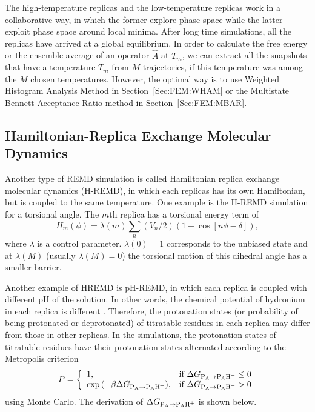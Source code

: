 The high-temperature replicas and the low-temperature replicas work in a collaborative way, in which the former explore phase space while the latter exploit phase space around local minima. After long time simulations, all the replicas have arrived at a global equilibrium. In order to calculate the free energy or the ensemble average of an operator $\hat A$ at $T_m$, we can extract all the snapshots that have a temperature $T_m$ from $M$ trajectories, if this temperature was among the $M$ chosen temperatures. However, the optimal way is to use Weighted Histogram Analysis Method in Section~\ref{Sec:FEM:WHAM} or the Multistate Bennett Acceptance Ratio method in Section~\ref{Sec:FEM:MBAR}.  

\subsection{Hamiltonian-Replica Exchange Molecular Dynamics\label{Sec:ES:REMD:HREMD}}
Another type of REMD simulation is called Hamiltonian replica exchange molecular dynamics (H-REMD), in which each replicas has its own Hamiltonian, but is coupled to the same temperature.\cite{JangPRL2003} One example is the H-REMD simulation for a torsional angle. The $m$th replica has a torsional energy term of 
\begin{equation}
	H_m(\phi)=\lambda(m)\sum_n\left(V_n/2\right)\left(1+\cos{\left[n\phi-\delta\right]}\right),
\end{equation}
where $\lambda$ is a control parameter. $\lambda(0)=1$ corresponds to the unbiased state and at $\lambda(M)$ (usually $\lambda(M)=0$) the torsional motion of this dihedral angle has a smaller barrier.

Another example of HREMD is pH-REMD, in which each replica is coupled with different pH of the solution. In other words, the chemical potential of hydronium in each replica is different . Therefore, the protonation states (or probability of being protonated or deprotonated) of titratable residues in each replica may differ from those in other replicas. In the simulations, the protonation states of titratable residues have their protonation states alternated according to the Metropolis criterion
\begin{equation}
	P= 
	\left\{ 
	\begin{array}{ll} 
		1, & \text{if } \Delta G_{\ce{P_{A}}\rightarrow \ce{P_{A}H^{+}}}\leq 0\\ 
		\exp{(-\beta\Delta G_{\ce{P_{A}}\rightarrow \ce{P_{A}H^{+}}})}, & \text{if }\Delta G_{\ce{P_{A}}\rightarrow \ce{P_{A}H^{+}}} >0\\  
	\end{array} 
	\right. 
\end{equation}
using Monte Carlo. The derivation of $\Delta G_{\ce{P_{A}}\rightarrow \ce{P_{A}H^{+}}}$ is shown below. 


